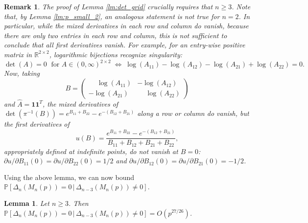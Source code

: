 \documentclass[reqno]{amsart}
\numberwithin{equation}{section}
\newtheorem{lemma}[theorem]{Lemma}
\newtheorem{remark}[theorem]{Remark}
\begin{document}
\begin{remark}
The proof of Lemma \ref{lm:det_grid} crucially requires that $n \ge 3$. Note that, by Lemma \ref{lm:p_small_2}, an analogous statement is not true for $n = 2$. In particular, while the mixed derivatives in each row and column do vanish, because there are only two entries in each row and column, this is not sufficient to conclude that all first derivatives vanish. For example, for an entry-wise positive matrix in  $\mathbb{R}^{2 \times 2}$, logarithmic bijections recognize singularity:
\[\det(A) = 0 \; \text{ for } A \in (0,\infty)^{2 \times 2} \; \Longleftrightarrow \; \log(A_{11}) - \log (A_{12}) - \log (A_{21}) + \log(A_{22}) = 0.\]
Now, taking 
\[B = \begin{pmatrix} \phantom{-}\log(A_{11}) & - \log (A_{12}) \\ - \log(A_{21}) & \phantom{-}\log(A_{22}) \end{pmatrix}\]
and $\hat A = \bm{1} \bm{1}^T$, the mixed derivatives of $\det (\pi^{-1}(B)) = e^{B_{11} + B_{22}} - e^{-(B_{12} + B_{21})}$ along a row or column do vanish, but the first derivatives of
\[u(B) = \frac{e^{B_{11} + B_{22}} - e^{-(B_{12} +B_{21})}}{B_{11} + B_{12} + B_{21} + B_{22}},\]
appropriately defined at indefinite points,
do not vanish at $B = 0$: $\partial u/\partial B_{11} (0) = \partial u/\partial B_{22} (0) = 1/2$ and $\partial u/\partial B_{12} (0) = \partial u/\partial B_{21} (0) = -1/2$.
\end{remark}

Using the above lemma, we can now bound $\mathbb{P}[\Delta_n(M_n(p)) = 0\, |\, \Delta_{n-3}(M_n(p)) \ne 0]$.

\begin{lemma}\label{lm:p_small_med_n}
Let $n \ge 3$. Then $\mathbb{P}[\Delta_n(M_n(p)) = 0\, |\, \Delta_{n-3}(M_n(p)) \ne 0] = O(p^{27/26})$.
\end{lemma}
\end{document}
